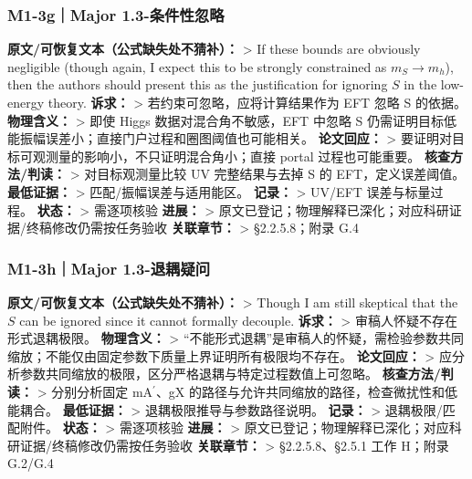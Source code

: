 \documentclass[
  chinese,
  UTF8]{ctexart}
\begin{document}
\subsubsection{M1-3g｜Major
1.3-条件性忽略}\label{m1-3gmajor-1.3-ux6761ux4ef6ux6027ux5ffdux7565}

\textbf{原文/可恢复文本（公式缺失处不猜补）：} \textgreater{} If these
bounds are obviously negligible (though again, I expect this to be
strongly constrained as \(m_S\to m_h\)), then the authors should present
this as the justification for ignoring \(S\) in the low-energy theory.
\textbf{诉求：} \textgreater{} 若约束可忽略，应将计算结果作为 EFT 忽略 S
的依据。 \textbf{物理含义：} \textgreater{} 即使 Higgs
数据对混合角不敏感，EFT 中忽略 S
仍需证明目标低能振幅误差小；直接门户过程和圈图阈值也可能相关。
\textbf{论文回应：} \textgreater{}
要证明对目标可观测量的影响小，不只证明混合角小；直接 portal
过程也可能重要。 \textbf{核查方法/判读：} \textgreater{}
对目标观测量比较 UV 完整结果与去掉 S 的 EFT，定义误差阈值。
\textbf{最低证据：} \textgreater{} 匹配/振幅误差与适用能区。
\textbf{记录：} \textgreater{} UV/EFT 误差与标量过程。 \textbf{状态：}
\textgreater{} 需逐项核验 \textbf{进展：} \textgreater{}
原文已登记；物理解释已深化；对应科研证据/终稿修改仍需按任务验收
\textbf{关联章节：} \textgreater{} §2.2.5.8；附录 G.4

\subsubsection{M1-3h｜Major
1.3-退耦疑问}\label{m1-3hmajor-1.3-ux9000ux8026ux7591ux95ee}

\textbf{原文/可恢复文本（公式缺失处不猜补）：} \textgreater{} Though I
am still skeptical that the \(S\) can be ignored since it cannot
formally decouple. \textbf{诉求：} \textgreater{}
审稿人怀疑不存在形式退耦极限。 \textbf{物理含义：} \textgreater{}
``不能形式退耦''是审稿人的怀疑，需检验参数共同缩放；不能仅由固定参数下质量上界证明所有极限均不存在。
\textbf{论文回应：} \textgreater{}
应分析参数共同缩放的极限，区分严格退耦与特定过程数值上可忽略。
\textbf{核查方法/判读：} \textgreater{} 分别分析固定
mA\ensuremath{^\prime}、gX
的路径与允许共同缩放的路径，检查微扰性和低能耦合。 \textbf{最低证据：}
\textgreater{} 退耦极限推导与参数路径说明。 \textbf{记录：}
\textgreater{} 退耦极限/匹配附件。 \textbf{状态：} \textgreater{}
需逐项核验 \textbf{进展：} \textgreater{}
原文已登记；物理解释已深化；对应科研证据/终稿修改仍需按任务验收
\textbf{关联章节：} \textgreater{} §2.2.5.8、§2.5.1 工作 H；附录 G.2/G.4
\end{document}
